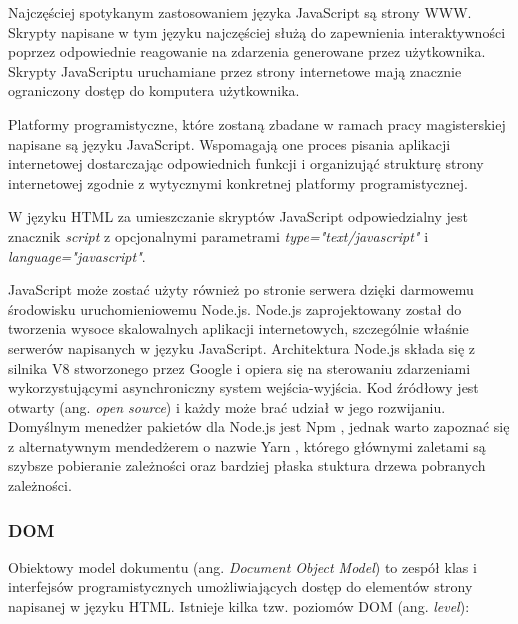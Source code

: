 \documentclass[polish, twoside, 12pt]{mwart}
\begin{document}
Najczęściej spotykanym zastosowaniem języka JavaScript są strony WWW. Skrypty napisane w tym języku najczęściej służą do zapewnienia interaktywności poprzez odpowiednie reagowanie na zdarzenia generowane przez użytkownika. Skrypty JavaScriptu uruchamiane przez strony internetowe mają znacznie ograniczony dostęp do komputera użytkownika. 

Platformy programistyczne, które zostaną zbadane w ramach pracy magisterskiej napisane są języku JavaScript. Wspomagają one proces pisania aplikacji internetowej dostarczając odpowiednich funkcji i organizująć strukturę strony internetowej zgodnie z wytycznymi konkretnej platformy programistycznej.

W języku HTML za umieszczanie skryptów JavaScript odpowiedzialny jest znacznik \emph{script} z opcjonalnymi parametrami \emph{type="text/javascript"} i \emph{language="javascript"}.

JavaScript może zostać użyty również po stronie serwera dzięki darmowemu środowisku uruchomieniowemu Node.js\cite{node.js}. Node.js zaprojektowany został do tworzenia wysoce skalowalnych aplikacji internetowych, szczególnie właśnie serwerów napisanych w języku JavaScript. Architektura Node.js składa się z silnika V8 \cite{v8} stworzonego przez Google i opiera się na sterowaniu zdarzeniami wykorzystującymi asynchroniczny system wejścia-wyjścia. Kod źródłowy jest otwarty (ang. \emph{open source}) i każdy może brać udział w jego rozwijaniu. Domyślnym menedżer pakietów dla Node.js jest Npm \cite{npm}, jednak warto zapoznać się z alternatywnym mendedżerem o nazwie Yarn \cite{yarn}, którego głównymi zaletami są szybsze pobieranie zależności oraz bardziej płaska stuktura drzewa pobranych zależności.

\subsubsection{DOM} \label{dom}

Obiektowy model dokumentu (ang. \emph{Document Object Model}) to zespół klas i interfejsów programistycznych umożliwiających dostęp do elementów strony napisanej w języku HTML. Istnieje kilka tzw. poziomów DOM (ang. \emph{level}):
\end{document}
